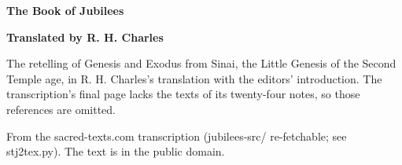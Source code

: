 \documentclass[11pt,letterpaper]{article}
\begin{document}
\color{ink}

\begin{titlepage}
\centering
\vspace*{4em}
{\LARGE\bfseries\color{heading} The Book of Jubilees\par}
\vspace{2em}
{\Large\bfseries\color{heading} Translated by R. H. Charles\par}
\vspace{2.5em}
{\itshape\color{subhead}\parbox{0.8\linewidth}{\centering The retelling of Genesis and Exodus from Sinai, the Little Genesis of the Second Temple age, in R. H. Charles's translation with the editors' introduction. The transcription's final page lacks the texts of its twenty-four notes, so those references are omitted.\par}}
\vfill
{\small From the sacred-texts.com transcription (jubilees-src/ re-fetchable; see stj2tex.py). The text is in the public domain.\par}
\vspace{2em}
\end{titlepage}

\tableofcontents


\end{document}
